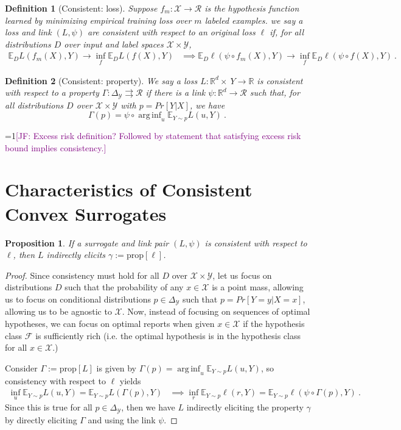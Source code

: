 \documentclass{article}
\newcommand{\Comments}{1}
\newcommand{\mynote}[2]{\ifnum\Comments=1\textcolor{#1}{#2}\fi}
\newcommand{\jessie}[1]{\mynote{purple}{[JF: #1]}}
\newcommand{\reals}{\mathbb{R}}
\newcommand{\simplex}{\Delta_\Y}
\newcommand{\prop}[1]{\mathrm{prop}[#1]}
\newcommand{\E}{\mathbb{E}}
\newcommand{\F}{\mathcal{F}}
\newcommand{\R}{\mathcal{R}}
\newcommand{\X}{\mathcal{X}}
\newcommand{\Y}{\mathcal{Y}}
\newcommand{\toto}{\rightrightarrows}
\newtheorem{proposition}{Proposition}
\newtheorem{definition}{Definition}
\DeclareMathOperator*{\arginf}{arg\,inf}
\begin{document}
\begin{definition}[Consistent: loss]
	Suppose $f_m : \X \to \R$ is the hypothesis function learned by minimizing empirical training loss over $m$ labeled examples.
	we say a loss and link $(L,\psi)$ are consistent with respect to an original loss $\ell$ if, for all distributions $D$ over input and label spaces $\X \times\Y$, 
	\begin{align*}
	\E_D L(f_m(X), Y) \to \inf_f \E_D L(f(X), Y) &\implies \E_D \ell(\psi \circ f_m(X), Y) \to \inf_f \E_D \ell(\psi \circ f(X), Y)~.~
	\end{align*}
\end{definition}

\begin{definition}[Consistent: property]
	We say a loss $L:\reals^d \times\ Y \to \reals$ is consistent with respect to a property $\Gamma : \simplex \toto \R$ if there is a link $\psi : \reals^d \to \R$ such that, for all distributions $D$ over $\X \times \Y$ with $p = Pr[Y |X]$, we have
	\begin{equation}
	\Gamma(p) = \psi \circ \arginf_{u} \E_{Y \sim p} L(u,Y)~.~
	\end{equation}
\end{definition}


\jessie{Excess risk definition?  Followed by statement that satisfying excess risk bound implies consistency.}


\section{Characteristics of Consistent Convex Surrogates}\label{sec:char-convex}


\begin{proposition}\label{prop:consistent-implies-indir-elic}
	If a surrogate and link pair $(L, \psi)$ is consistent with respect to $\ell$, then $L$ indirectly elicits $\gamma := \prop{\ell}$.
\end{proposition}
\begin{proof}
Since consistency must hold for all $D$ over $\X \times \Y$, let us focus on distributions $D$ such that the probability of any $x \in \X$ is a point mass, allowing us to focus on conditional distributions $p \in \simplex$ such that $p = Pr[Y = y | X = x]$, allowing us to be agnostic to $\X$.
Now, instead of focusing on sequences of optimal hypotheses, we can focus on optimal reports when given $x \in \X$ if the hypothesis class $\F$ is sufficiently rich (i.e. the optimal hypothesis is in the hypothesis class for all $x \in \X$.)

Consider $\Gamma := \prop{L}$ is given by $\Gamma(p) = \arginf_u \E_{Y \sim p} L(u, Y)$, so consistency with respect to $\ell$ yields 
\begin{align*}
\inf_u \E_{Y \sim p} L(u, Y) = \E_{Y \sim p} L(\Gamma(p), Y) &\implies \inf_r \E_{Y \sim p} \ell(r, Y) = \E_{Y \sim p} \ell(\psi \circ \Gamma(p), Y)~.~ 
\end{align*}
Since this is true for all $p \in \simplex$, then we have $L$ indirectly eliciting the property $\gamma$ by directly eliciting $\Gamma$ and using the link $\psi$.
\end{proof}
\end{document}
